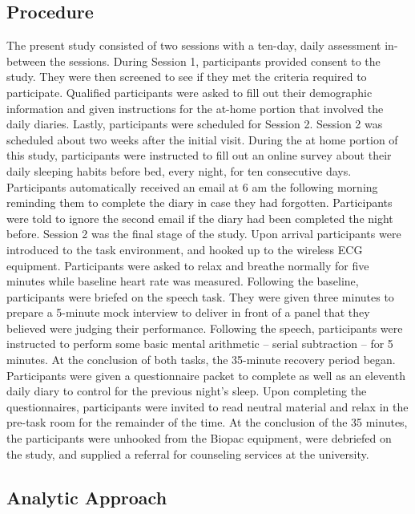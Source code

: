 \documentclass[
  man, fleqn, noextraspace]{apa6}
\begin{document}
\hypertarget{procedure}{%
\subsection{Procedure}\label{procedure}}

The present study consisted of two sessions with a ten-day, daily assessment in-between the sessions. During Session 1, participants provided consent to the study. They were then screened to see if they met the criteria required to participate. Qualified participants were asked to fill out their demographic information and given instructions for the at-home portion that involved the daily diaries. Lastly, participants were scheduled for Session 2. Session 2 was scheduled about two weeks after the initial visit. During the at home portion of this study, participants were instructed to fill out an online survey about their daily sleeping habits before bed, every night, for ten consecutive days. Participants automatically received an email at 6 am the following morning reminding them to complete the diary in case they had forgotten. Participants were told to ignore the second email if the diary had been completed the night before. Session 2 was the final stage of the study. Upon arrival participants were introduced to the task environment, and hooked up to the wireless ECG equipment. Participants were asked to relax and breathe normally for five minutes while baseline heart rate was measured. Following the baseline, participants were briefed on the speech task. They were given three minutes to prepare a 5-minute mock interview to deliver in front of a panel that they believed were judging their performance. Following the speech, participants were instructed to perform some basic mental arithmetic -- serial subtraction -- for 5 minutes. At the conclusion of both tasks, the 35-minute recovery period began. Participants were given a questionnaire packet to complete as well as an eleventh daily diary to control for the previous night's sleep. Upon completing the questionnaires, participants were invited to read neutral material and relax in the pre-task room for the remainder of the time. At the conclusion of the 35 minutes, the participants were unhooked from the Biopac equipment, were debriefed on the study, and supplied a referral for counseling services at the university.

\hypertarget{analytic-approach}{%
\subsection{Analytic Approach}\label{analytic-approach}}
\end{document}
